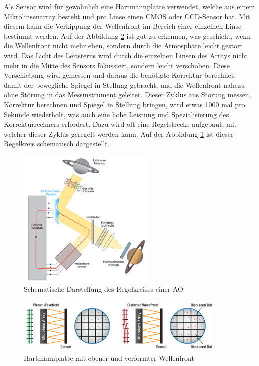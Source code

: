 \begin{refsection}
Als Sensor wird für gewöhnlich eine Hartmannplatte verwendet, welche aus einem Mikrolinsenarray besteht und pro Linse einen CMOS oder CCD-Sensor hat. Mit diesem kann  die Verkippung der Wellenfront im Bereich einer einzelnen Linse bestimmt werden. Auf der Abbildung \ref{fig:hartmannplatte} ist gut zu erkennen, was geschieht, wenn die Wellenfront nicht mehr eben, sondern durch die Atmosphäre leicht gestört wird. Das Licht des Leitsterns wird durch die einzelnen Linsen des Arrays nicht mehr in die Mitte des Sensors fokussiert, sondern leicht verschoben. Diese Verschiebung wird gemessen und daraus die benötigte Korrektur berechnet, damit der bewegliche Spiegel in Stellung gebracht, und die Wellenfront nahezu ohne Störung in das Messinstrument geleitet. Dieser Zyklus aus Störung messen, Korrektur berechnen und Spiegel in Stellung bringen, wird etwas 1000 mal pro Sekunde wiederholt, was auch eine hohe Leistung und Spezialisierung des Korrekturrechners erfordert. Dazu wird oft eine Regelstrecke aufgebaut, mit welcher dieser Zyklus geregelt werden kann. Auf der Abbildung \ref{fig:schematischAO} ist dieser Regelkreis schematisch dargestellt.

\begin{figure}
  \centering
  \includegraphics[width=0.6\textwidth]{adaptiv/images/schematichAO}
  \caption{Schematische Darstellung des Regelkreises einer AO
    \cite{robani:schematischAO}}
  \label{fig:schematischAO}
\end{figure}

\begin{figure}
  \centering
  \includegraphics[width=0.9\textwidth]{adaptiv/images/hartmannplatte}
  \caption{Hartmannplatte mit ebener und verformter Wellenfront
    \cite{thor:hartmannplatte}}
  \label{fig:hartmannplatte}
\end{figure}


\end{refsection}
